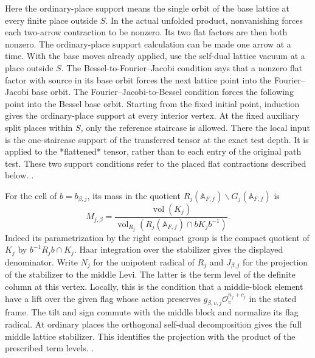 Here the ordinary-place support means the single orbit of the
base lattice at every finite place outside \(S\). In the actual
unfolded product, nonvanishing forces each two-arrow contraction
to be nonzero. Its two flat factors are then both nonzero.
The ordinary-place support calculation can be made one arrow
at a time. With the base moves already applied, use the
self-dual lattice vacuum at a place outside \(S\). The
Bessel-to-Fourier--Jacobi condition says that a nonzero flat
factor with source in its base orbit forces the next
lattice point into the Fourier--Jacobi base orbit. The
Fourier--Jacobi-to-Bessel condition forces the following
point into the Bessel base orbit. Starting from the fixed
initial point, induction gives the ordinary-place support at
every interior vertex. At the fixed auxiliary split places
within \(S\), only the reference staircase is allowed. There the
local input is the one-staircase support of the transferred
tensor at the exact test depth. It is applied to the *flattened*
tensor, rather than to each entry of the original path test.
These two support conditions refer to the placed flat
contractions described below.
.

For the cell of \(b=b_{\beta,j}\), its mass in the quotient
\(R_j(\mathbb A_{F,f})\backslash G_j(\mathbb A_{F,f})\) is
\[
 M_{j,\beta}=
 \frac{\operatorname{vol}(K_j)}
      {\operatorname{vol}_{R_j}(R_j(\mathbb A_{F,f})\cap bK_jb^{-1})}.
\]
Indeed its parametrization by the right compact group is the compact
quotient of \(K_j\) by \(b^{-1}R_jb\cap K_j\). Haar integration
over the stabilizer gives the displayed denominator. Write \(N_j\)
for the unipotent radical of \(R_j\) and \(J_{\beta,j}\) for the
projection of the stabilizer to the middle Levi. The latter is the
term level of the definite column at this vertex. Locally, this is
the condition that a middle-block element have a lift over the
given flag whose action preserves \(g_{\beta,v,j}\mathcal O_v^{n_j+c_j}\)
in the stated frame. The tilt and sign commute with the middle
block and normalize its flag radical. At ordinary places the
orthogonal self-dual decomposition gives the full middle lattice
stabilizer. This identifies the projection with the product
of the prescribed term levels.
.

